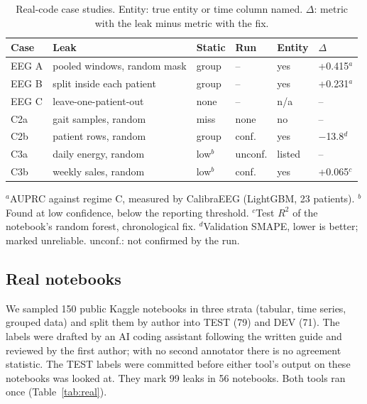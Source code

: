 \documentclass[conference]{IEEEtran}
\begin{document}
\begin{table}[t]
\caption{Real-code case studies. Entity: true entity or time column named. $\Delta$: metric with the leak minus
metric with the fix.}
\label{tab:cases}
\footnotesize
\setlength{\tabcolsep}{2.2pt}
\begin{tabularx}{\columnwidth}{@{}l>{\raggedright\arraybackslash}Xllll@{}}
\toprule
\textbf{Case} & \textbf{Leak} & \textbf{Static} & \textbf{Run} & \textbf{Entity} & \textbf{$\Delta$} \\
\midrule
EEG A & pooled windows, random mask & group & -- & yes & +0.415$^{a}$ \\
EEG B & split inside each patient & group & -- & yes & +0.231$^{a}$ \\
EEG C & leave-one-patient-out & none & -- & n/a & -- \\
C2a & gait samples, random & miss & none & no & -- \\
C2b & patient rows, random & group & conf. & yes & $-$13.8$^{d}$ \\
C3a & daily energy, random & low$^{b}$ & unconf. & listed & -- \\
C3b & weekly sales, random & low$^{b}$ & conf. & yes & +0.065$^{c}$ \\
\bottomrule
\end{tabularx}

\vspace{2pt}
\raggedright $^{a}$AUPRC against regime C, measured by CalibraEEG (LightGBM, 23 patients). $^{b}$Found at low confidence, below the reporting threshold. $^{c}$Test $R^2$ of the notebook's random
forest, chronological fix. $^{d}$Validation SMAPE, lower is better; marked unreliable.
unconf.: not confirmed by the run.
\end{table}

\subsection{Real notebooks}

We sampled 150 public Kaggle notebooks in three strata (tabular, time series, grouped data) and split them by
author into TEST (79) and DEV (71). The labels were drafted by an AI coding assistant following the
written guide and reviewed by the first author; with no second annotator there is no agreement statistic. The TEST labels were committed before either tool's output on these
notebooks was looked at. They mark 99 leaks in 56 notebooks. Both tools ran once (Table~\ref{tab:real}).
\end{document}
